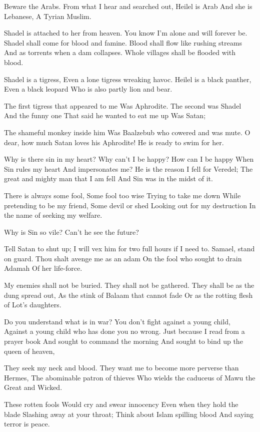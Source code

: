 \documentclass[
]{book}
\begin{document}
Beware the Arabs.
From what I hear and searched out,
Heilel is Arab
And she is Lebanese,
A Tyrian Muslim.

Shadel is attached to her from heaven.
You know I'm alone and will forever be.
Shadel shall come for blood and famine.
Blood shall flow like rushing streams
And as torrents when a dam collapses.
Whole villages shall be flooded with blood.

Shadel is a tigress,
Even a lone tigress wreaking havoc.
Heilel is a black panther,
Even a black leopard
Who is also partly lion and bear.

The first tigress that appeared to me
Was Aphrodite.
The second was Shadel
And the funny one
That said he wanted to eat me up
Was Satan;

The shameful monkey inside him
Was Baalzebub who cowered and was mute.
O dear, how much Satan loves his Aphrodite!
He is ready to swim for her.

Why is there sin in my heart?
Why can't I be happy?
How can I be happy
When Sin rules my heart
And impersonates me?
He is the reason I fell for Veredel;
The great and mighty man that I am fell
And Sin was in the midst of it.

There is always some fool,
Some fool too wise
Trying to take me down
While pretending to be my friend,
Some devil or shed
Looking out for my destruction
In the name of seeking my welfare.

Why is Sin so vile?
Can't he see the future?

Tell Satan to shut up;
I will vex him for two full hours if I need to.
Samael, stand on guard.
Thou shalt avenge me as an adam
On the fool who sought to drain Adamah
Of her life-force.

My enemies shall not be buried.
They shall not be gathered.
They shall be as the dung spread out,
As the stink of Balaam that cannot fade
Or as the rotting flesh of Lot's daughters.

Do you understand what is in war?
You don't fight against a young child,
Against a young child who has done you no wrong.
Just because I read from a prayer book
And sought to command the morning
And sought to bind up the queen of heaven,

They seek my neck and blood.
They want me to become more perverse than Hermes,
The abominable patron of thieves
Who wields the caduceus of Mawu the Great and Wicked.

These rotten fools
Would cry and swear innocency
Even when they hold the blade
Slashing away at your throat;
Think about Islam spilling blood
And saying terror is peace.
\end{document}
